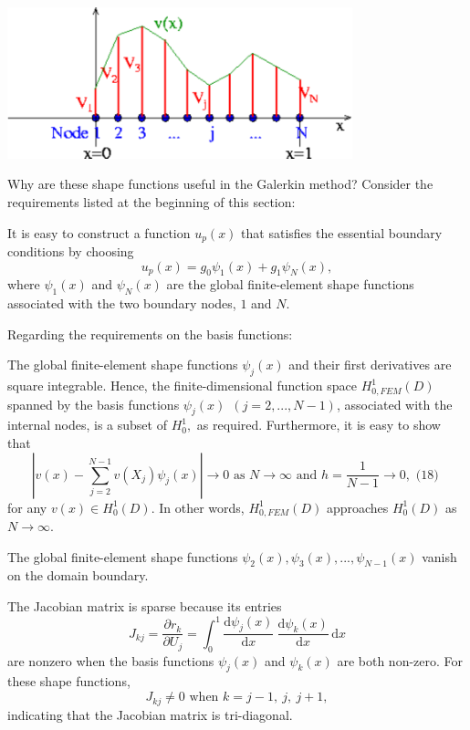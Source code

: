  
\begin{DoxyImage}
\includegraphics[width=0.75\textwidth]{fe_is_interpolant}
\end{DoxyImage}


Why are these shape functions useful in the Galerkin method? Consider the requirements listed at the beginning of this section\+:
\begin{DoxyEnumerate}
\item It is easy to construct a function $ u_p(x) $ that satisfies the essential boundary conditions by choosing \[ u_p(x) = g_0 \psi_1(x) + g_1 \psi_N(x), \] where $ \psi_1(x) $ and $ \psi_N(x) $ are the global finite-\/element shape functions associated with the two boundary nodes, $1$ and $N$.
\item Regarding the requirements on the basis functions\+:
\begin{DoxyEnumerate}
\item The global finite-\/element shape functions $ \psi_j(x) $ and their first derivatives are square integrable. Hence, the finite-\/dimensional function space $ H^1_{0,FEM}(D) $ spanned by the basis functions $ \psi_j(x) \ \ (j=2,...,N-1)$, associated with the internal nodes, is a subset of $ H^1_0,$ as required. Furthermore, it is easy to show that \[ \left| v(x) - \sum_{j=2}^{N-1} v(X_j) \psi_j(x) \right| \to 0 \mbox{\ \ \ as $N\to\infty$ and $h=\frac{1}{N-1} \to 0,$ \ \ \ \ \ \ \ (18) } \] for any $ v(x) \in H^1_0(D) $. In other words, $ H^1_{0,FEM}(D) $ approaches $ H^1_0(D) $ as $ N \to \infty. $
\item The global finite-\/element shape functions $ \psi_2(x), \psi_3(x),...,\psi_{N-1}(x) $ vanish on the domain boundary.
\item The Jacobian matrix is sparse because its entries \[ J_{kj} = \frac{\partial r_k}{\partial U_j} = \int_0^1 \frac{\mbox{d} \psi_j(x)}{\mbox{d} x} \ \frac{\mbox{d} \psi_k(x)}{\mbox{d} x} \, \mbox{d}x \] are nonzero when the basis functions $ \psi_j(x) $ and $ \psi_k(x) $ are both non-\/zero. For these shape functions, \[ J_{kj} \ne 0 \mbox{\ \ \ \ when \ \ $k=j-1,\ j, \ j+1,$} \] indicating that the Jacobian matrix is tri-\/diagonal.
\end{DoxyEnumerate}
\end{DoxyEnumerate}

